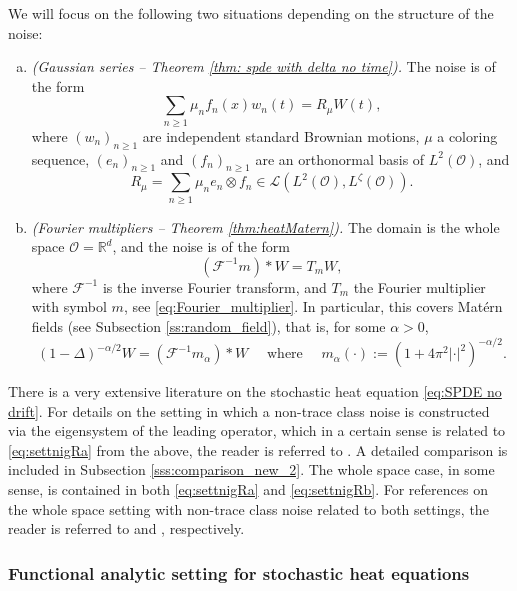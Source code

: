 \documentclass[reqno]{amsart}
\theoremstyle{plain}
\theoremstyle{remark}
\theoremstyle{plain}
\numberwithin{equation}{section}
\newcommand\cF{\mathscr{F}}
\newcommand\cL{\mathcal{L}}
\newcommand\cO{\mathcal{O}}
\def\R{{\mathbb R}}
\newcommand{\F}{{\mathscr F}}
\newcommand{\1}{\one}
\begin{document}
We will focus on the following two situations depending on the structure of the noise:
\begin{enumerate}[(a)]
    \item\label{eq:settnigRa} \emph{(Gaussian series -- Theorem \ref{thm: spde with delta no time}).} The noise is of the form
    \[ \sum_{n\geq 1} \mu_n f_n(x) w_n(t) = R_\mu  W(t),\]
where $(w_n)_{n\geq 1}$ are independent standard Brownian motions, $\mu$ a coloring sequence, $(e_n)_{n\geq 1}$ and $(f_n)_{n\geq 1}$ are an orthonormal basis of $L^2(\cO)$, and
\begin{equation}
\label{eq:Tmu_def2}
R_\mu = \sum_{n\geq 1} \mu_n e_n\otimes f_n \in \cL(L^2(\cO), L^\zeta(\cO)).
\end{equation}
\item\label{eq:settnigRb} \emph{(Fourier multipliers -- Theorem \ref{thm:heatMatern}).} The domain is the whole space $\cO=\R^d$, and the noise is of the form
$$
(\cF^{-1}m )*W= T_m W,
$$
where $\F^{-1}$ is the inverse Fourier transform, and $T_m$ the Fourier multiplier with symbol $m$, see \eqref{eq:Fourier_multiplier}. In particular, this covers Mat\'ern fields (see Subsection \ref{ss:random_field}), that is, for some $\alpha>0$,
$$
(1-\Delta)^{-\alpha/2} W = (\F^{-1}m_\alpha )*W \quad  
\text{ where }\quad m_\alpha(\cdot):=(1+4\pi^2|\cdot|^2)^{-\alpha/2}.
$$
\end{enumerate}

There is a very extensive literature on the stochastic heat equation \eqref{eq:SPDE no drift}. For details on the setting in which a non-trace class noise is constructed via the eigensystem of the leading operator, which in a certain sense is related to \eqref{eq:settnigRa} from the above, the reader is referred to \cite{C03, cerrai2009khasminskii, cerrai2011averaging,cerrai2025nonlinear,cerrai2003large, Salins22, Salinstrans}. A detailed comparison is included in Subsection \ref{sss:comparison_new_2}. The whole space case, in some sense, is contained in both \eqref{eq:settnigRa} and \eqref{eq:settnigRb}. For references on the whole space setting with non-trace class noise related to both settings, the reader is referred to  \cite{Kry} and \cite{Dal99,Khos,Salinsunbdd,sanz2002holder}, respectively.



\subsubsection{Functional analytic setting for stochastic heat equations}
\label{sss:func_analytic_setting_heat}
\end{document}
